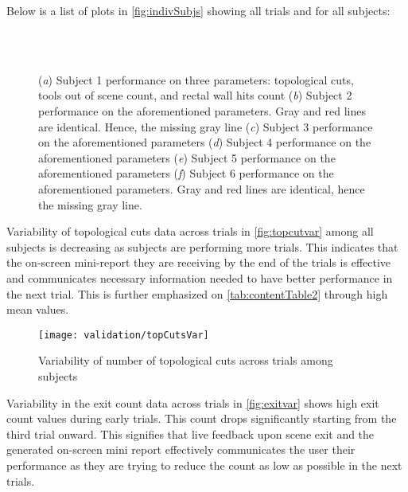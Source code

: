 Below is a list of plots in \autoref{fig:indivSubjs} showing all trials and for all subjects:

\begin{figure}
  \centering
  \qquad
  \qquad\\
  \qquad
  \qquad\\
  \qquad
  \caption{(\emph{a}) Subject 1 performance on three parameters: topological cuts, tools out of scene count, and rectal wall hits count (\emph{b}) Subject 2 performance on the aforementioned parameters. Gray and red lines are identical. Hence, the missing gray line (\emph{c}) Subject 3 performance on the aforementioned parameters (\emph{d}) Subject 4 performance on the aforementioned parameters (\emph{e}) Subject 5 performance on the aforementioned parameters (\emph{f}) Subject 6 performance on the aforementioned parameters. Gray and red lines are identical, hence the missing gray line.}\label{fig:indivSubjs}
\end{figure}

Variability of topological cuts data across trials in \autoref{fig:topcutvar} among all subjects is decreasing as subjects are performing more trials. This indicates that the on-screen mini-report they are receiving by the end of the trials is effective and communicates necessary information needed to have better performance in the next trial. This is further emphasized on \autoref{tab:contentTable2} through high mean values.

\begin{figure}
  \centering
  \texttt{[image: validation/topCutsVar]}
  \caption{Variability of number of topological cuts across trials among subjects}
  \label{fig:topcutvar}
\end{figure}

Variability in the exit count data across trials in \autoref{fig:exitvar} shows high exit count values during early trials. This count drops significantly starting from the third trial onward. This signifies that live feedback upon scene exit and the generated on-screen mini report effectively communicates the user their performance as they are trying to reduce the count as low as possible in the next trials.

